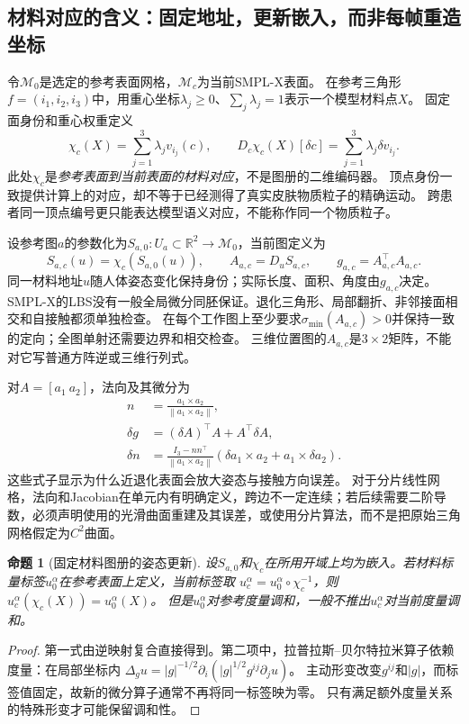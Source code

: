 \documentclass[11pt,a4paper]{article}
\numberwithin{equation}{section}
\newtheorem{proposition}[theorem]{命题}
\theoremstyle{definition}
\newcommand{\R}{\mathbb R}
\newcommand{\norm}[1]{\left\lVert#1\right\rVert}
\begin{document}
\subsection{材料对应的含义：固定地址，更新嵌入，而非每帧重造坐标}
\label{geo:sub:material}

令$\mathcal M_0$是选定的参考表面网格，$\mathcal M_c$为当前SMPL-X表面。
在参考三角形$f=(i_1,i_2,i_3)$中，用重心坐标$\lambda_j\geq0$、$\sum_j\lambda_j=1$表示一个模型材料点$X$。
固定面身份和重心权重定义
\begin{equation}
 \chi_c(X)=\sum_{j=1}^{3}\lambda_j v_{i_j}(c),
 \qquad D_c\chi_c(X)[\delta c]
       =\sum_{j=1}^{3}\lambda_j\delta v_{i_j}.
 \label{geo:eq:material-map}
\end{equation}
此处$\chi_c$是\emph{参考表面到当前表面的材料对应}，不是图册的二维编码器。
顶点身份一致提供计算上的对应，却不等于已经测得了真实皮肤物质粒子的精确运动。
跨患者同一顶点编号更只能表达模型语义对应，不能称作同一个物质粒子。

设参考图$a$的参数化为$S_{a,0}:U_a\subset\R^2\to\mathcal M_0$，当前图定义为
\begin{equation}
 S_{a,c}(u)=\chi_c(S_{a,0}(u)),\qquad
 A_{a,c}=D_uS_{a,c},\qquad
 g_{a,c}=A_{a,c}^{\top}A_{a,c}.
 \label{geo:eq:surface-chart}
\end{equation}
同一材料地址$u$随人体姿态变化保持身份；实际长度、面积、角度由$g_{a,c}$决定。
SMPL-X的LBS没有一般全局微分同胚保证。退化三角形、局部翻折、非邻接面相交和自接触都须单独检查。
在每个工作图上至少要求$\sigma_{\min}(A_{a,c})>0$并保持一致的定向；全图单射还需要边界和相交检查。
三维位置图的$A_{a,c}$是$3\times2$矩阵，不能对它写普通方阵逆或三维行列式。

对$A=[a_1\ a_2]$，法向及其微分为
\begin{align}
 n&=\frac{a_1\times a_2}{\norm{a_1\times a_2}},\\
 \delta g&=(\delta A)^{\top}A+A^{\top}\delta A,\\
 \delta n&=\frac{I_3-nn^{\top}}{\norm{a_1\times a_2}}
              (\delta a_1\times a_2+a_1\times\delta a_2).
 \label{geo:eq:normal-differential}
\end{align}
这些式子显示为什么近退化表面会放大姿态与接触方向误差。
对于分片线性网格，法向和Jacobian在单元内有明确定义，跨边不一定连续；若后续需要二阶导数，必须声明使用的光滑曲面重建及其误差，或使用分片算法，而不是把原始三角网格假定为$C^2$曲面。

\begin{proposition}[固定材料图册的姿态更新]
\label{geo:prop:fixed-atlas}
设$S_{a,0}$和$\chi_c$在所用开域上均为嵌入。若材料标量标签$u_0^\alpha$在参考表面上定义，当前标签取
$u_c^\alpha=u_0^\alpha\circ\chi_c^{-1}$，则
$u_c^\alpha(\chi_c(X))=u_0^\alpha(X)$。
但是$u_0^\alpha$对参考度量调和，一般不推出$u_c^\alpha$对当前度量调和。
\end{proposition}
\begin{proof}
第一式由逆映射复合直接得到。第二项中，拉普拉斯--贝尔特拉米算子依赖度量：在局部坐标内
$\Delta_g u=|g|^{-1/2}\partial_i(|g|^{1/2}g^{ij}\partial_j u)$。
主动形变改变$g^{ij}$和$|g|$，而标签值固定，故新的微分算子通常不再将同一标签映为零。
只有满足额外度量关系的特殊形变才可能保留调和性。
\end{proof}
\end{document}
